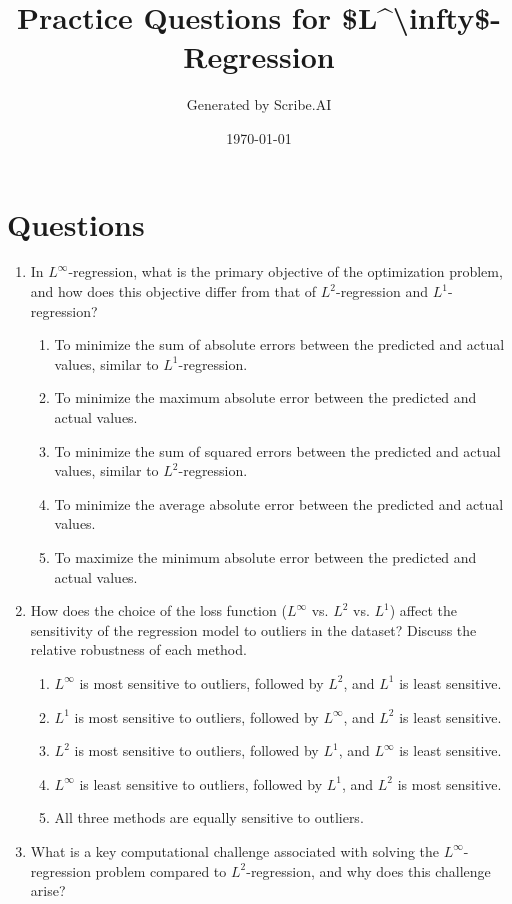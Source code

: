 \documentclass{article}%
\title{Practice Questions for \$L\^{}\textbackslash{}infty\${-}Regression}%
\author{Generated by Scribe.AI}%
\date{\today}%
\begin{document}
%
\normalsize%
\maketitle%
\section{Questions}%
\label{sec:Questions}%
\begin{enumerate}%
\item In $L^\infty$-regression, what is the primary objective of the optimization problem, and how does this objective differ from that of $L^2$-regression and $L^1$-regression?%
\begin{enumerate}%
\item To minimize the sum of absolute errors between the predicted and actual values, similar to $L^1$-regression.%
\item To minimize the maximum absolute error between the predicted and actual values.%
\item To minimize the sum of squared errors between the predicted and actual values, similar to $L^2$-regression.%
\item To minimize the average absolute error between the predicted and actual values.%
\item To maximize the minimum absolute error between the predicted and actual values.%
\end{enumerate}%
\vspace{1em}%
\item How does the choice of the loss function ($L^\infty$ vs. $L^2$ vs. $L^1$) affect the sensitivity of the regression model to outliers in the dataset?  Discuss the relative robustness of each method.%
\begin{enumerate}%
\item $L^\infty$ is most sensitive to outliers, followed by $L^2$, and $L^1$ is least sensitive.%
\item $L^1$ is most sensitive to outliers, followed by $L^\infty$, and $L^2$ is least sensitive.%
\item $L^2$ is most sensitive to outliers, followed by $L^1$, and $L^\infty$ is least sensitive.%
\item $L^\infty$ is least sensitive to outliers, followed by $L^1$, and $L^2$ is most sensitive.%
\item All three methods are equally sensitive to outliers.%
\end{enumerate}%
\vspace{1em}%
\item What is a key computational challenge associated with solving the $L^\infty$-regression problem compared to $L^2$-regression, and why does this challenge arise?%

\end{enumerate}
\end{document}
